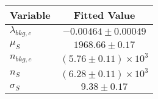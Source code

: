 \begin{tabular}[t]{lc}
\hline
Variable &Fitted Value\\
\hline\hline
$\lambda_{bkg,c}$&$-0.00464\pm0.00049$\\
\hline
$\mu_{S}$&$1968.66\pm0.17$\\
\hline
$n_{bkg,c}$&$(5.76\pm0.11)\times 10^3$\\
\hline
$n_{S}$&$(6.28\pm0.11)\times 10^3$\\
\hline
$\sigma_{S}$&$9.38\pm0.17$\\
\hline
\end{tabular}
